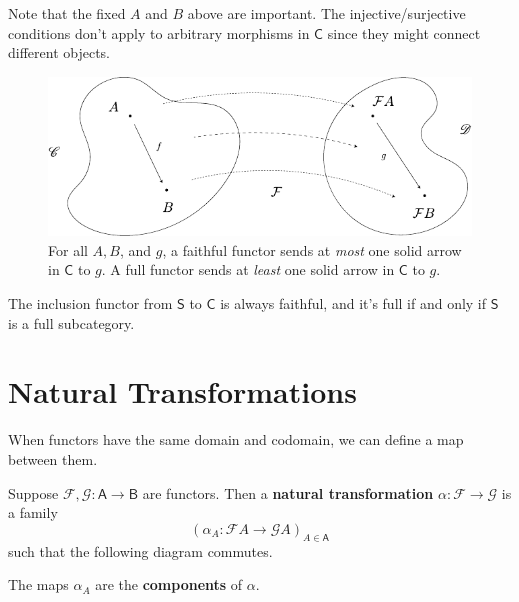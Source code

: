 \documentclass[10pt]{report}
\newcommand{\cat}[1]{\mathsf{#1}}
\begin{document}
Note that the fixed $A$ and $B$ above are important. The injective/surjective conditions don't apply to arbitrary morphisms in $\cat{C}$ since they might connect different objects.

\begin{figure}[H]
	\centering
	\includegraphics[scale=1]{fig/faith-full.pdf}
	\caption{For all $A, B$, and $g$, a faithful functor sends at \textit{most} one solid arrow in $\cat{C}$ to $g$. A full functor sends at \textit{least} one solid arrow in $\cat{C}$ to $g$.}
\end{figure}

\begin{ex}
The inclusion functor from $\cat{S}$ to $\cat{C}$ is always faithful, and it's full if and only if $\cat{S}$ is a full subcategory.
\end{ex}


\section{Natural Transformations}

When functors have the same domain and codomain, we can define a map between them.

\begin{defn}
Suppose $\mathcal{F},\mathcal{G}:\cat{A}\to \cat{B}$ are functors. Then a \textbf{natural transformation} $\alpha:\mathcal{F}\to \mathcal{G}$ is a family
\[
	(\alpha_A: \mathcal{F}A \to \mathcal{G}A)_{A \in \cat{A}}
\] such that the following diagram commutes.
\begin{figure}[H]
	\centering
{}
\end{figure}

The maps $\alpha_A$ are the \textbf{components} of $\alpha$.
\end{defn}
\end{document}
